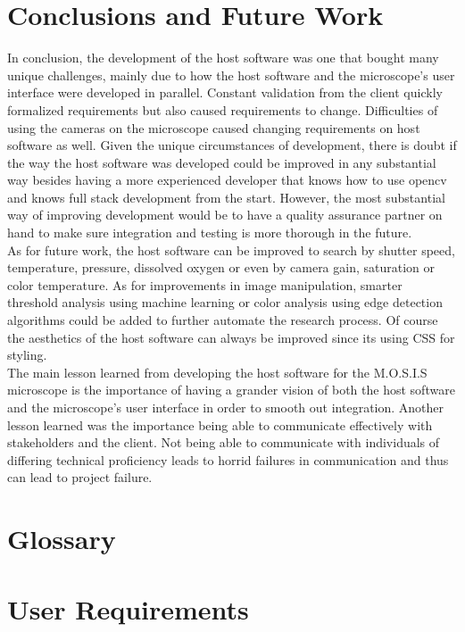 \documentclass[12pt]{article}
\begin{document}
\section{Conclusions and Future Work}
In conclusion, the development of the host software was one that bought many unique challenges, mainly due to how the host software and the microscope's user interface were developed in parallel. Constant validation from the client quickly formalized requirements but also caused requirements to change. Difficulties of using the cameras on the microscope caused changing requirements on host software as well. Given the unique circumstances of development, there is doubt if the way the host software was developed could be improved in any substantial way besides having a more experienced developer that knows how to use opencv and knows full stack development from the start. However, the most substantial way of improving development would be to have a quality assurance partner on hand to make sure integration and testing is more thorough in the future.\\
As for future work, the host software can be improved to search by shutter speed, temperature, pressure, dissolved oxygen or even by camera gain, saturation or color temperature. As for improvements in image manipulation, smarter threshold analysis using machine learning or color analysis using edge detection algorithms could be added to further automate the research process. Of course the aesthetics of the host software can always be improved since its using CSS for styling.\\
The main lesson learned from developing the host software for the M.O.S.I.S microscope is the importance of having a grander vision of both the host software and the microscope's user interface in order to smooth out integration. Another lesson learned was the importance being able to communicate effectively with stakeholders and the client. Not being able to communicate with individuals of differing technical proficiency leads to horrid failures in communication and thus can lead to project failure.


\appendix
\section{Glossary}
\section{User Requirements}
\end{document}
